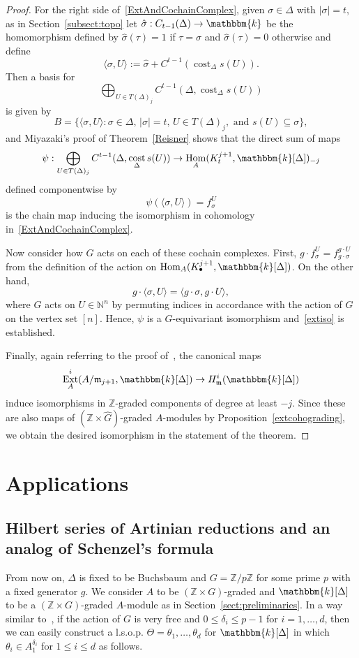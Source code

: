 \documentclass[ALCO,ThmDefs,Unicode]{cedram}
\DeclareMathOperator\cost{cost}
\DeclareMathOperator{\Hom}{Hom}
\DeclareMathOperator{\Ext}{Ext}
\newcommand{\field}{\mathbbm{k}}
\newcommand{\NN}{{\mathbb N}}
\newcommand{\ZZ}{{\mathbb Z}}
\newcommand{\mideal}{\ensuremath{\mathfrak{m}}}
\begin{document}
\begin{proof}
For the right side of~\eqref{ExtAndCochainComplex}, given $\sigma\in \Delta$ with $|\sigma|=t$, as in Section~\ref{subsect:topo} let $\hat{\sigma}:C_{t-1}(\Delta)\to\field$ be the homomorphism defined by $\hat{\sigma}(\tau)=1$ if $\tau=\sigma$ and $\hat{\sigma}(\tau)=0$ otherwise and define
\[
\langle \sigma, U\rangle:=\hat{\sigma}+C^{t-1}(\cost_\Delta s(U)).
\]
Then a basis for
\[
\bigoplus_{U\in T(\Delta)_j}C^{t-1}(\Delta, \cost_\Delta s(U))
\]
is given by
\[
B=\{\langle \sigma, U\rangle : \sigma\in\Delta, \, |\sigma|=t, \, U\in T(\Delta)_j, \text{ and } s(U)\subseteq \sigma\},
\]
and Miyazaki's proof of Theorem~\ref{Reisner} shows that the direct sum of maps
\[
\psi:\bigoplus_{U\in T(\Delta)_j}C^{t-1}(\Delta, \cost_\Delta s(U))\to \Hom_A(K_t^{j+1}, \field[\Delta])_{-j}
\]
defined componentwise by
\[
\psi(\langle \sigma, U\rangle)=f_{\sigma}^U
\]
is the chain map inducing the isomorphism in cohomology in~\eqref{ExtAndCochainComplex}.

Now consider how $G$ acts on each of these cochain complexes. First, $g\cdot f_\sigma^U=f_{g\cdot \sigma}^{g\cdot U}$ from the definition of the action on $\Hom_A(K_\bullet^{j+1}, \field[\Delta])$. On the other hand,
\[
g\cdot\langle \sigma, U\rangle=\langle g \cdot \sigma, g\cdot U\rangle,
\]
where $G$ acts on $U\in\NN^n$ by permuting indices in accordance with the action of $G$ on the vertex set $[n]$. Hence, $\psi$ is a $G$-equivariant isomorphism and~\eqref{extiso} is established.

Finally, again referring to the proof of~\cite[Theorem~1]{characterizations}, the canonical maps
\[
\Ext_A^i(A/\mideal_{j+1}, \field[\Delta])\to H_\mideal^i(\field[\Delta])
\]
induce isomorphisms in $\ZZ$-graded components of degree at least $-j$. Since these are also maps of $(\ZZ\times \hat{G})$-graded $A$-modules by Proposition~\ref{extcohograding}, we obtain the desired isomorphism in the statement of the theorem.
\end{proof}


\section{Applications}\label{Applications}

\subsection{Hilbert series of Artinian reductions and an analog of Schenzel's formula}\label{SchenzelSection}
From now on, $\Delta$ is fixed to be Buchsbaum and $G=\ZZ/p\ZZ$ for some prime $p$ with a fixed generator $g$. We consider $A$ to be $(\ZZ\times G)$-graded and $\field[\Delta]$ to be a $(\ZZ\times G)$-graded $A$-module as in Section~\ref{sect:preliminaries}. In a way similar to~\cite[Section~8]{St-96}, if the action of $G$ is very free and $0\le \delta_i\le p-1$ for $i=1, \ldots, d$, then we can easily construct a l.s.o.p. $\Theta=\theta_1, \ldots, \theta_d$ for $\field[\Delta]$ in which $\theta_i\in A_1^{\delta_i}$ for $1\le i \le d$ as follows.
\end{document}
